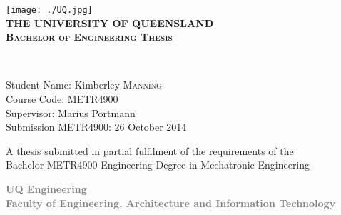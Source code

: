 \begin{titlepage}

\begin{center}

\texttt{[image: ./UQ.jpg]}\\[1.5cm]    

\textsc{\Large \bfseries {\Huge T}HE {\Huge U}NIVERSITY OF {\Huge Q}UEENSLAND}\\[2cm]

\textsc{\large \bfseries Bachelor of Engineering Thesis}\\[1.5cm]


\newlength{\mylength}

\setlength{\fboxsep}{1pt}
\setlength{\mylength}{\linewidth}

\addtolength{\mylength}{-1.5\fboxsep}
\addtolength{\mylength}{-1.5\fboxrule}


		
\textsc{}\\[1.5cm]

\begin{minipage}{0.8\textwidth}
\begin{flushleft} \large
Student Name: Kimberley \textsc{Manning}\\[0.1cm]
Course Code: METR4900\\[0.1cm]
Supervisor: Marius Portmann\\[0.1cm]
Submission METR4900: 26 October 2014\\[0.1cm]
\end{flushleft}
\end{minipage}




\vfill


{\small A thesis submitted in partial fulfilment of the requirements of the\\
Bachelor METR4900 Engineering Degree in Mechatronic Engineering\\[1.5cm]}

\textcolor{Gray}
{
{\small  \bfseries UQ Engineering\\[0.5cm]
Faculty of Engineering, Architecture and Information Technology}
}


\end{center}

\end{titlepage}
